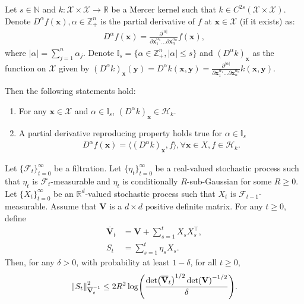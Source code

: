 \begin{auxlemma}
\label{lemma:pinn-bo_rkhs_derivative}
    Let $s \in \mathbb{N}$ and $k \colon \mathcal{X} \times \mathcal{X} \rightarrow \mathbb{R}$ be a Mercer kernel such that $k \in C^{2s} (\mathcal{X} \times \mathcal{X})$. Denote $D^\alpha f(\mathbf{x}), \alpha \in \mathbb{Z}^n_+$ is the partial derivative of $f$ at $\mathbf{x} \in \mathcal{X}$ (if it exists) as:
\begin{align*}
    D^\alpha f(\mathbf{x}) =  \frac{\partial ^ {\lvert \alpha \rvert}}{\partial{\mathbf{x}_1^{\alpha_1}} \dots \partial{\mathbf{x}_n^{\alpha_n}}} f(\mathbf{x}),
\end{align*}
where $\lvert \alpha \rvert = \sum_{j=1}^n \alpha_j$. Denote $\mathbb{I}_s = \{\alpha \in \mathbb{Z}_+^n, \lvert \alpha \rvert \le s\}$ and  $(D^\alpha k)_\mathbf{x}$ as the function on $\mathcal{X}$ given by $(D^\alpha k)_\mathbf{x} (\mathbf{y}) = D^\alpha k(\mathbf{x}, \mathbf{y}) =  \frac{\partial^ {\lvert \alpha \rvert}}{\partial{\mathbf{x}_1^{\alpha_1}} \dots \partial{\mathbf{x}_n^{\alpha_n}}} k(\mathbf{x}, \mathbf{y})$.

Then the following statements hold: 

\begin{enumerate}
    \item For any $\mathbf{x} \in \mathcal{X}$ and  $\alpha \in \mathbb{I}_s$, $(D^\alpha k)_\mathbf{x} \in \mathcal{H}_k$.
    \item A partial derivative reproducing property holds true for $\alpha \in \mathbb{I}_s$
    \begin{align*}
        D^\alpha f(\mathbf{x}) = \langle (D^\alpha k)_\mathbf{x}, f \rangle,  \forall \mathbf{x} \in X, f \in \mathcal{H}_k.
    \end{align*}
\end{enumerate}
\end{auxlemma}

\begin{auxlemma}
\label{lemma:pinn-bo_self-normalized_bound}
Let $\{\mathcal{F}_t\}_{t=0}^\infty$ be a filtration. Let $\{\eta_t\}_{t=0}^\infty$ be a real-valued stochastic process such that $\eta_t$ is $\mathcal{F}_t$-measurable and $\eta_t$ is conditionally $R$-sub-Gaussian for some $R \ge 0$. Let $\{X_t\}_{t=0}^\infty$ be an $\mathbb{R}^d$-valued stochastic process such that $X_t$ is $\mathcal{F}_{t-1}$-measurable. Assume that $\mathbf{V}$
is a $d \times d$ positive definite matrix. For any $t \ge 0$, define
\begin{align*}
    \overline{\mathbf{V}}_t &= \mathbf{V} + \sum_{s=1}^t X_s X_s^\top, \\
    S_t &= \sum_{s=1}^t \eta_s X_s.
\end{align*}
Then, for any $\delta > 0$, with probability at least $1 - \delta$, for all $t \ge 0$,
\[
\norm{S_t}^2_{\overline{\mathbf{V}}_t^{-1}} \le 2R^2\log(\frac{\det(\overline{\mathbf{V}}_t)^{1/2}\det(\mathbf{V})^{-1/2}}{\delta}).
\] 
\end{auxlemma}

